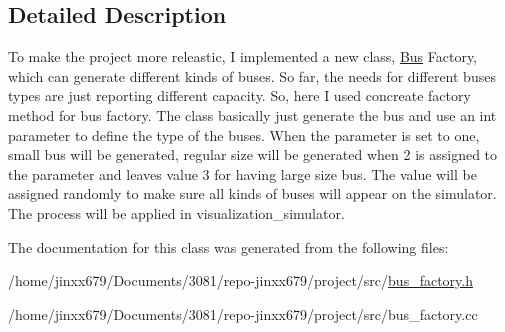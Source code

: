 \subsection{Detailed Description}
To make the project more releastic, I implemented a new class, \hyperlink{classBus}{Bus} Factory, which can generate different kinds of buses. So far, the needs for different buses types are just reporting different capacity. So, here I used concreate factory method for bus factory. The class basically just generate the bus and use an int parameter to define the type of the buses. When the parameter is set to one, small bus will be generated, regular size will be generated when 2 is assigned to the parameter and leaves value 3 for having large size bus. The value will be assigned randomly to make sure all kinds of buses will appear on the simulator. The process will be applied in visualization\+\_\+simulator. 

The documentation for this class was generated from the following files\+:\begin{DoxyCompactItemize}
\item 
/home/jinxx679/\+Documents/3081/repo-\/jinxx679/project/src/\hyperlink{bus__factory_8h}{bus\+\_\+factory.\+h}\item 
/home/jinxx679/\+Documents/3081/repo-\/jinxx679/project/src/bus\+\_\+factory.\+cc\end{DoxyCompactItemize}
